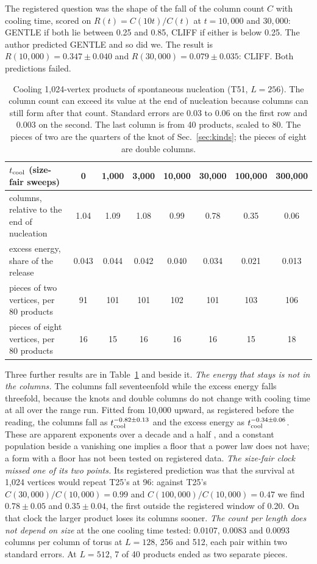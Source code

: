 \documentclass[aps,pre,10pt,twocolumn,superscriptaddress,nofootinbib]{revtex4-2}
\begin{document}
The registered question was the shape of the fall of the column count $C$ with cooling time, scored on
$R(t) = C(10t)/C(t)$ at $t = 10{,}000$ and $30{,}000$: GENTLE if both lie between 0.25 and 0.85, CLIFF if
either is below 0.25. The author predicted GENTLE and so did we. The result is $R(10{,}000) = 0.347 \pm 0.040$
and $R(30{,}000) = 0.079 \pm 0.035$: CLIFF. Both predictions failed.

\begin{table}
\centering
\small
\begin{tabular}{@{}lccccccc@{}}
\toprule
$t_{\rm cool}$ (size-fair sweeps) & 0 & 1,000 & 3,000 & 10,000 & 30,000 & 100,000 & 300,000 \\
\midrule
columns, relative to the end of nucleation & 1.04 & 1.09 & 1.08 & 0.99 & 0.78 & 0.35 & 0.06 \\
excess energy, share of the release & 0.043 & 0.044 & 0.042 & 0.040 & 0.034 & 0.021 & 0.013 \\
pieces of two vertices, per 80 products & 91 & 101 & 101 & 102 & 101 & 103 & 106 \\
pieces of eight vertices, per 80 products & 16 & 15 & 16 & 16 & 16 & 15 & 18 \\
\bottomrule
\end{tabular}
\caption{Cooling 1,024-vertex products of spontaneous nucleation (T51, $L = 256$). The column count can exceed
its value at the end of nucleation because columns can still form after that count. Standard errors are 0.03 to
0.06 on the first row and 0.003 on the second. The last column is from 40 products, scaled to 80. The pieces of
two are the quarters of the knot of Sec.~\ref{sec:kinds}; the pieces of eight are double columns.}
\label{tab:t51}
\end{table}

Three further results are in Table~\ref{tab:t51} and beside it. \emph{The energy that stays is not in the
columns.} The columns fall seventeenfold while the excess energy falls threefold, because the knots and
double columns do not change with cooling time at all over the range run. Fitted from 10,000 upward, as
registered before the reading, the columns fall as $t_{\rm cool}^{-0.82 \pm 0.13}$ and the excess energy as
$t_{\rm cool}^{-0.34 \pm 0.06}$. These are apparent exponents over a decade and a half \cite{BBJC26}, and a
constant population beside a vanishing one implies a floor that a power law does not have; a form with a floor
has not been tested on registered data. \emph{The size-fair clock missed one of its two points.} Its
registered prediction was that the survival at 1,024 vertices would repeat T25's at 96: against T25's
$C(30{,}000)/C(10{,}000) = 0.99$ and $C(100{,}000)/C(10{,}000) = 0.47$ we find $0.78 \pm 0.05$ and
$0.35 \pm 0.04$, the first outside the registered window of 0.20. On that clock the larger product loses its
columns sooner. \emph{The count per length does not depend on size} at the one cooling time tested: $0.0107$,
$0.0083$ and $0.0093$ columns per column of torus at $L = 128$, 256 and 512, each pair within two standard
errors. At $L = 512$, 7 of 40 products ended as two separate pieces.
\end{document}

